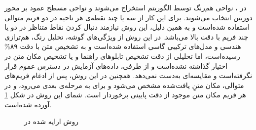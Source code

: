 \documentclass[12pt,a4paper]{article}
\theoremstyle{definition}
\theoremstyle{theorem}
\theoremstyle{definition}
\begin{document}
در \cite{fromVid}، نواحی هم‌رنگ توسط الگوریتم  استخراج می‌شوند و نواحی مسطح عمود بر محور دوربین انتخاب می‌شوند. برای این کار از سه یا چند نقطه‌ی هر ناحیه در دو فریم‌ متوالی استفاده شده‌است و به همین دلیل، این روش نیازمند دنبال کردن نقاط متناظر در دو یا چند فریم با دقت بالا می‌باشد. در این روش از ویژگی‌های گوشه، تحلیل رنگ، هم‌ترازی هندسی و مدل‌های ترکیبی گاسی استفاده شده‌است و به تشخیص متن با دقت ۸۹\% رسیده‌است، اما تحلیلی از دقت تشخیص تابلوهای راهنما و یا تشخیص مکان متن در اختیار گذاشته‌ نشده‌است و از طرفی، داده‌های آزمایش در دسترس عموم قرار نگرفته‌است و مقایسه‌ای به‌دست نمی‌دهد. همچنین در این روش، پس از ادغام فریم‌های متوالی، مکان متنِ یافت‌شده مشخص می‌شود و برای  به مرحله‌ی بعدی می‌رود، و در هر فریم مکان متن موجود از دقت پایینی برخوردار است. شمای این روش در شکل \ref{vid-pic} آورده شده‌است. 
\begin{figure}[t]
\centering
{}
\caption{روش ارایه شده در \cite{fromVid}}
\label{vid-pic}
\end{figure}
\end{document}
